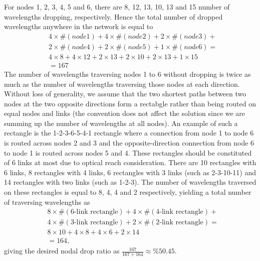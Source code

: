 \documentclass[10pt,letterpaper]{article}
\begin{document}
For nodes 1, 2, 3, 4, 5 and 6, there are 8, 12, 13, 10, 13 and 15 number of wavelengths dropping, respectively. Hence the total number of dropped wavelengths anywhere in the network is equal to
\begin{equation}\begin{split}
&4\times \#(node1)
+
4\times \#(node2)
+
2\times \#(node3)
+
\\&
2\times \#(node4)
+
2\times \#(node5)
+
1\times \#(node6)
=
\\&
4\times 8+
4\times 12+
2\times 13+
2\times 10+
2\times 13+
1\times 15
\\&=167
\end{split}\end{equation}
The number of wavelengths traversing nodes 1 to 6 without dropping is twice as much as the number of wavelengths traversing those nodes at each direction. Without loss of generality, we assume that the two shortest paths between two nodes at the two opposite directions form a rectabgle rather than being routed on equal nodes and links (the convention does not affect the solution since we are summing up the number of wavelengths at all nodes). An example of such a rectangle is the 1-2-3-6-5-4-1 rectangle where a connection from node 1 to node 6 is routed across nodes 2 and 3 and the opposite-direction connection from node 6 to node 1 is routed across nodes 5 and 4. These rectangles should be constituted of 6 links at most due to optical reach consideration. There are 10 rectangles with 6 links, 8 rectangles with 4 links, 6 rectangles with 3 links (such as 2-3-10-11) and 14 rectangles with two links (such as 1-2-3). The number of wavelengths traversed on these rectangles is equal to 8, 4, 4 and 2 respectively, yielding a total number of traversing wavelengths as
\begin{equation}\begin{split}
&8\times \#(\text{6-link rectangle})
+
4\times \#(\text{4-link rectangle})
+
\\&
4\times \#(\text{3-link rectangle})
+
2\times \#(\text{2-link rectangle})
=
\\&
8\times 10+
4\times 8+
4\times 6+
2\times 14
\\&=164,
\end{split}\end{equation}
giving the desired nodal drop ratio as $\frac{167}{167+164}\approx\%50.45$.
\end{document}
